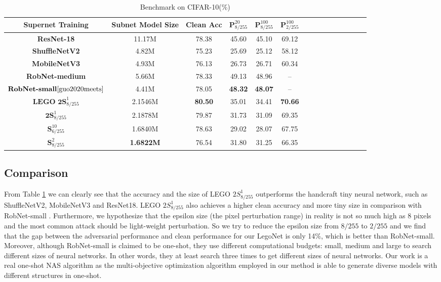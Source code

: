 \documentclass[journal]{IEEEtran}
\newcommand{\revised}[1]{{\color{black} #1}}
\begin{document}
\begin{table}[th]
    \centering
    \setlength{\tabcolsep}{0.5mm}
    \caption{Benchmark on CIFAR-10(\%)}
    \begin{tabular}{c|c|c|cccccccccccc}
    Supernet Training& Subnet Model Size & Clean Acc & $\textbf{P}_{8/255}^{20}$ & $\textbf{P}_{8/255}^{100}$ & $\textbf{P}_{2/255}^{100}$\\
    \hline 
    \textbf{\revised{ResNet-18}} & 11.17M & 78.38 & 45.60 & 45.10 & 69.12 \\
    \hline
    \textbf{\revised{ShuffleNetV2}} & 4.82M & 75.23 & 25.69 & 25.12 & 58.12\\ 
    \hline
    \textbf{\revised{MobileNetV3}} & 4.93M & 76.13 & 26.73 & 26.71 & 60.34 \\ 
    \hline
    \textbf{\revised{RobNet-medium}}\cite{guo2020meets} & 5.66M & 78.33 & 49.13 & 48.96 & -- \\
    \hline
    $\textbf{RobNet-small}\cite{guo2020meets}$ & 4.41M & 78.05 & \textbf{48.32} & \textbf{48.07} & -- \\
    \hline
    $\textbf{LEGO 2S}_{8/255}^{1}$ & 2.1546M & \textbf{80.50} & 35.01 & 34.41 & \textbf{70.66}\\
    \hline
    $\textbf{2S}_{8/255}^{1}$ & 2.1878M & 79.87 &31.73 & 31.09 & 69.35\\ 
    \hline
    $\textbf{S}_{6/255}^{10}$ & 1.6840M & 78.63 & 29.02 & 28.07 & 67.75 \\
    \hline
    $\textbf{S}_{8/255}^{2}$ & \textbf{1.6822M} & 76.54 & 31.80 & 31.25 & 66.35 \\
    \hline
    \end{tabular}\label{tab:benchmark_cifar10}
\end{table}



\subsection{\textbf{Comparison}}
\revised{From Table \ref{tab:benchmark_cifar10} we can clearly see that the accuracy and the size of LEGO $2S_{8/255}^{1}$ outperforms the handcraft tiny neural network, such as ShuffleNetV2, MobileNetV3 and ResNet18. LEGO $2S_{8/255}^{1}$ also achieves a higher clean accuracy and more tiny size in comparison with RobNet-small \cite{guo2020meets}. Furthermore, we hypothesize that the epsilon size (the pixel perturbation range) in reality is not so much high as 8 pixels and the most common attack should be light-weight perturbation. So we try to reduce the epsilon size from $8/255$ to $2/255$ and we find that the gap between the adversarial performance and clean performance for our LegoNet is only 14\%, which is better than RobNet-small. Moreover, although RobNet-small is claimed to be one-shot, they use different computational budgets: small, medium and large to search different sizes of neural networks. In other words, they at least search three times to get different sizes of neural networks. Our work is a real one-shot NAS algorithm as the multi-objective optimization algorithm employed in our method is able to generate diverse models with different structures in one-shot}.
\end{document}
